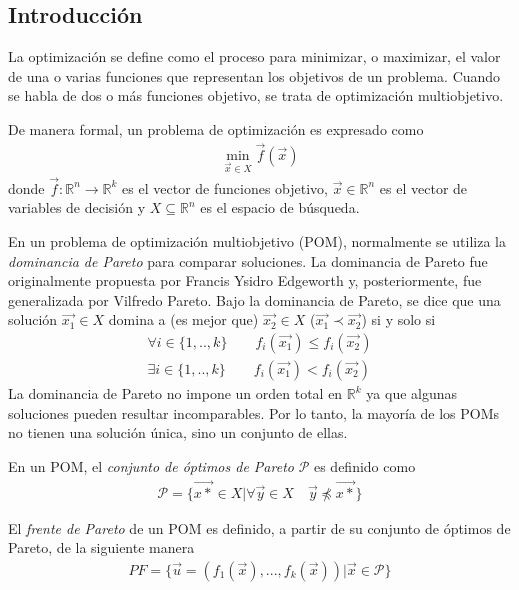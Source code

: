 \documentclass[serif]{beamer}
\begin{document}
\subsection{Introducción}
\begin{frame}
La optimizaci\'{o}n se define como el proceso para minimizar, o maximizar, el valor de una o varias funciones que representan los objetivos de un problema. Cuando se habla de dos o m\'{a}s funciones objetivo, se trata de optimizaci\'{o}n multiobjetivo.

De manera formal, un problema de optimizaci\'{o}n es expresado como
\begin{align}
\displaystyle \min_{\vec{x} \in X} \vec{f} (\vec{x})
\end{align}
donde $\vec{f} : \mathbb{R}^n \rightarrow \mathbb{R}^k$ es el vector de funciones objetivo, $\vec{x} \in \mathbb{R}^n$ es el vector de variables de decisi\'{o}n y $X \subseteq \mathbb{R}^n$ es el espacio de b\'{u}squeda.
\end{frame}
\begin{frame}
En un problema de optimizaci\'{o}n multiobjetivo (POM), normalmente se utiliza la \emph{dominancia de Pareto} para comparar soluciones. La dominancia de Pareto fue originalmente propuesta por Francis Ysidro Edgeworth y, posteriormente, fue generalizada por Vilfredo Pareto. Bajo la dominancia de Pareto, se dice que una soluci\'{o}n $\vec{x_1} \in X$ domina a (es mejor que) $\vec{x_2} \in X$ ($\vec{x_1} \prec \vec{x_2}$) si y solo si
\begin{align}
\forall i \in \{1,..,k\} \qquad f_i(\vec{x_1}) \leq f_i(\vec{x_2}) \\ 
\exists i \in \{1,..,k\} \qquad f_i(\vec{x_1}) < f_i(\vec{x_2})
\end{align}
La dominancia de Pareto no impone un orden total en $\mathbb{R}^k$ ya que algunas soluciones pueden resultar incomparables. Por lo tanto, la mayor\'{i}a de los POMs no tienen una soluci\'{o}n \'{u}nica, sino un conjunto de ellas.
\end{frame}
\begin{frame}
En un POM, el \emph{conjunto de \'{o}ptimos de Pareto} $\mathcal{P}$ es definido como
\begin{align}
\mathcal{P} = \{ \vec{x*} \in X | \forall \vec{y} \in X \quad \vec{y} \npreceq \vec{x*} \}
\end{align}

El \emph{frente de Pareto} de un POM es definido, a partir de su conjunto de \'{o}ptimos de Pareto, de la siguiente manera
\begin{align}
PF = \{ \vec{u} = (f_1(\vec{x}),...,f_k(\vec{x})) | \vec{x} \in \mathcal{P} \}
\end{align}
\end{frame}
\end{document}
